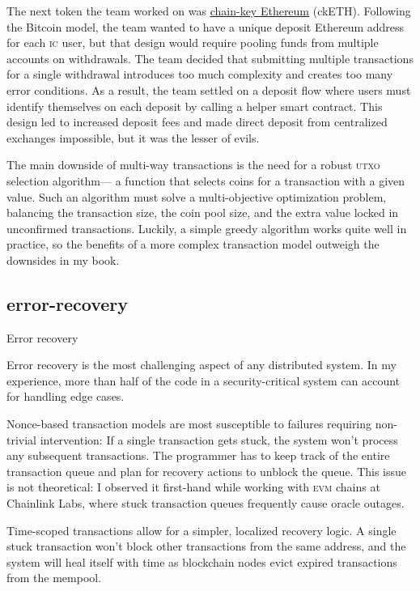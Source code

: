 \documentclass{article}
\begin{document}
The next token the team worked on was \href{https://support.dfinity.org/hc/en-us/articles/20273018220180-What-are-ckETH-and-ckERC-20-tokens}{chain-key Ethereum} (ckETH).
Following the Bitcoin model,
the team wanted to have a unique deposit Ethereum address for each \textsc{ic} user,
but that design would require pooling funds from multiple accounts on withdrawals.
The team decided that submitting multiple transactions for a single withdrawal
introduces too much complexity and creates too many error conditions.
As a result, the team settled on a deposit flow
where users must identify themselves on each deposit by calling a helper smart contract.
This design led to increased deposit fees and made direct deposit from centralized exchanges impossible,
but it was the lesser of evils.

The main downside of multi-way transactions is the need for a robust \textsc{utxo} selection algorithm---%
a function that selects coins for a transaction with a given value.
Such an algorithm must solve a multi-objective optimization problem,
balancing the transaction size, the coin pool size, and the extra value locked in unconfirmed transactions.
Luckily, a simple greedy algorithm works quite well in practice,
so the benefits of a more complex transaction model outweigh the downsides in my book.

\subsection{error-recovery}{Error recovery}

Error recovery is the most challenging aspect of any distributed system.
In my experience, more than half of the code in a security-critical system can account for handling edge cases.

Nonce-based transaction models are most susceptible to failures requiring non-trivial intervention:
If a single transaction gets stuck, the system won't process any subsequent transactions.
The programmer has to keep track of the entire transaction queue and plan for recovery actions to unblock the queue.
This issue is not theoretical: I observed it first-hand while working with \textsc{evm} chains at Chainlink Labs,
where stuck transaction queues frequently cause oracle outages.

Time-scoped transactions allow for a simpler, localized recovery logic.
A single stuck transaction won't block other transactions from the same address,
and the system will heal itself with time
as blockchain nodes evict expired transactions from the mempool.
\end{document}
